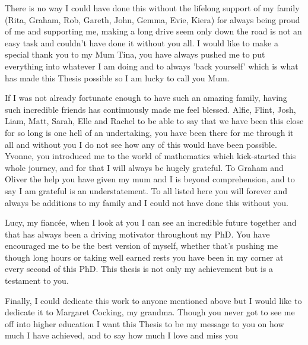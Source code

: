 \documentclass[12pt,english]{report}
\begin{document}
There is no way I could have done this without the lifelong support of my family (Rita, Graham, Rob, Gareth, John, Gemma, Evie, Kiera) for always being proud of me and supporting me, making a long drive seem only down the road is not an easy task and couldn't have done it without you all. I would like to make a special thank you to my Mum Tina, you have always pushed me to put everything into whatever I am doing and to always 'back yourself' which is what has made this Thesis possible so I am lucky to call you Mum.

If I was not already fortunate enough to have such an amazing family, having such incredible friends has continuously made me feel blessed. Alfie, Flint, Josh, Liam, Matt, Sarah, Elle and Rachel to be able to say that we have been this close for so long is one hell of an undertaking, you have been there for me through it all and without you I do not see how any of this would have been possible. Yvonne, you introduced me to the world of mathematics which kick-started this whole journey, and for that I will always be hugely grateful. To Graham and Oliver the help you have given my mum and I is beyond comprehension, and to say I am grateful is an understatement. To all listed here you will forever and always be additions to my family and I could not have done this without you. 

Lucy, my fianc\'ee, when I look at you I can see an incredible future together and that has always been a driving motivator throughout my PhD. You have encouraged me to be the best version of myself, whether that's pushing me though long hours or taking well earned rests you have been in my corner at every second of this PhD. This thesis is not only my achievement but is a testament to you.

Finally, I could dedicate this work to anyone mentioned above but I would like to dedicate it to Margaret Cocking, my grandma. Though you never got to see me off into higher education I want this Thesis to be my message to you on how much I have achieved, and to say how much I love and miss you
\vspace*{\fill}

\newpage
\pagestyle{fancy}
\fancyhf{}
\renewcommand{\headrulewidth}{1 pt}
\renewcommand{\headrule}{\hbox to\headwidth{\color{gray}\leaders\hrule height \headrulewidth\hfill}}
\tableofcontents

\newpage
{}

\end{document}
